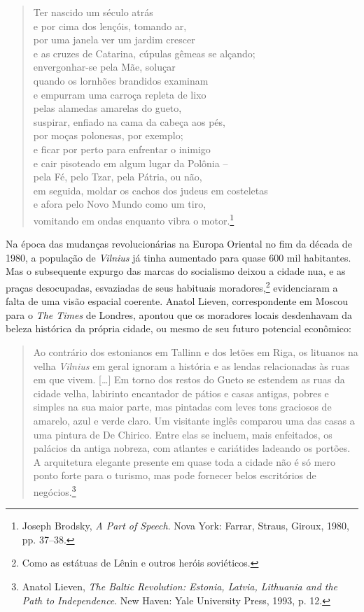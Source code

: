 \begin{verse}
Ter nascido um século atrás\\
e por cima dos lençóis, tomando ar,\\
por uma janela ver um jardim crescer\\
e as cruzes de Catarina, cúpulas gêmeas se alçando;\\
envergonhar-se pela Mãe, soluçar\\
quando os lornhões brandidos examinam\\
e empurram uma carroça repleta de lixo\\
pelas alamedas amarelas do gueto,\\
suspirar, enfiado na cama da cabeça aos pés,\\
por moças polonesas, por exemplo;\\
e ficar por perto para enfrentar o inimigo\\
e cair pisoteado em algum lugar da Polônia --\\
pela Fé, pelo Tzar, pela Pátria, ou não,\\
em seguida, moldar os cachos dos judeus em \qb{}costeletas\\
e afora pelo Novo Mundo como um tiro,\\
vomitando em ondas enquanto vibra o motor.\footnote{Joseph Brodsky, \textit{A Part of Speech}. Nova York: Farrar, Straus, Giroux, 1980, pp. 37--38.}
\end{verse}

Na época das mudanças revolucionárias na Europa Oriental no fim da
década de 1980, a população de \textit{Vilnius} já tinha aumentado para quase
600 mil habitantes. Mas o subsequente expurgo das marcas do
socialismo deixou a cidade nua, e as praças desocupadas, esvaziadas de
seus habituais moradores,\footnote{Como as estátuas de Lênin e outros heróis
soviéticos.} evidenciaram a falta de uma visão espacial coerente. Anatol
Lieven, correspondente em Moscou para o \textit{The Times} de Londres,
apontou que os moradores locais desdenhavam da beleza histórica da
própria cidade, ou mesmo de seu futuro potencial econômico:

\begin{quote}
Ao contrário dos estonianos em Tallinn e dos letões em Riga, os lituanos
na velha \textit{Vilnius} em geral ignoram a história e as lendas relacionadas às
ruas em que vivem. [\ldots{}] Em torno dos restos do Gueto se estendem as
ruas da cidade velha, labirinto encantador de pátios e casas antigas,
pobres e simples na sua maior parte, mas pintadas com leves tons
graciosos de amarelo, azul e verde claro. Um visitante inglês comparou
uma das casas a uma pintura de De Chirico. Entre elas se incluem, mais
enfeitados, os palácios da antiga nobreza, com atlantes e cariátides
ladeando os portões. A arquitetura elegante presente em quase toda a
cidade não é só mero ponto forte para o turismo, mas pode fornecer belos
escritórios de negócios.\footnote{Anatol Lieven, \textit{The Baltic Revolution: Estonia, Latvia, Lithuania and the Path to Independence}. New Haven: Yale University Press, 1993, p. 12.} \end{quote}

